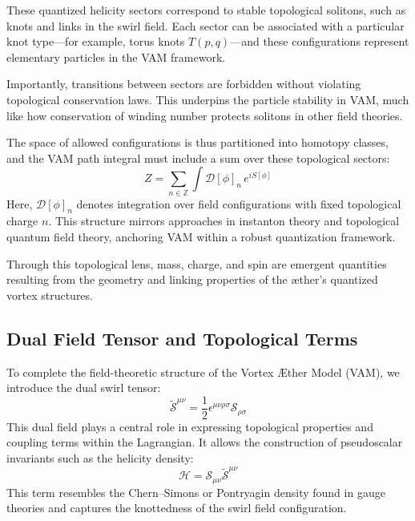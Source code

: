         These quantized helicity sectors correspond to stable topological solitons, such as knots and links in the swirl field. Each sector can be associated with a particular knot type---for example, torus knots $T(p,q)$---and these configurations represent elementary particles in the VAM framework.

        Importantly, transitions between sectors are forbidden without violating topological conservation laws. This underpins the particle stability in VAM, much like how conservation of winding number protects solitons in other field theories.

        The space of allowed configurations is thus partitioned into homotopy classes, and the VAM path integral must include a sum over these topological sectors:
        \begin{equation}
            Z = \sum_{n \in \mathbb{Z}} \int \mathcal{D}[\phi]_n \, e^{i S[\phi]}
        \end{equation}
        Here, $\mathcal{D}[\phi]_n$ denotes integration over field configurations with fixed topological charge $n$. This structure mirrors approaches in instanton theory and topological quantum field theory, anchoring VAM within a robust quantization framework.

        Through this topological lens, mass, charge, and spin are emergent quantities resulting from the geometry and linking properties of the æther's quantized vortex structures.

        \subsection{Dual Field Tensor and Topological Terms}
        To complete the field-theoretic structure of the Vortex Æther Model (VAM), we introduce the dual swirl tensor:
        \begin{equation}
            \tilde{\mathcal{S}}^{\mu\nu} = \frac{1}{2} \epsilon^{\mu\nu\rho\sigma} \mathcal{S}_{\rho\sigma}
        \end{equation}
        This dual field plays a central role in expressing topological properties and coupling terms within the Lagrangian. It allows the construction of pseudoscalar invariants such as the helicity density:
        \begin{equation}
            \mathcal{H} = \mathcal{S}_{\mu\nu} \tilde{\mathcal{S}}^{\mu\nu}
        \end{equation}
        This term resembles the Chern--Simons or Pontryagin density found in gauge theories and captures the knottedness of the swirl field configuration.

